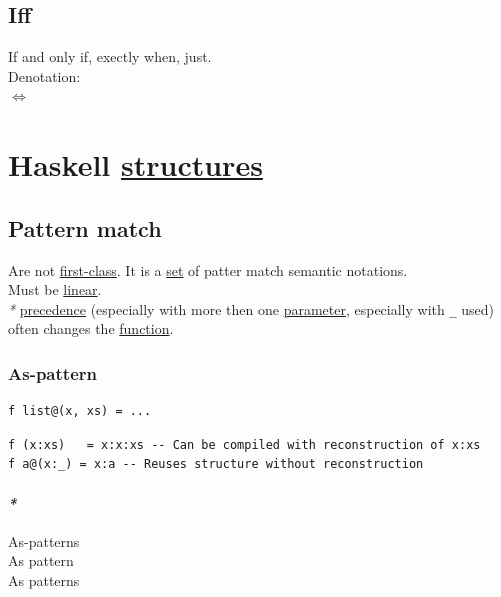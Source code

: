 \documentclass[a4paper,14pt,oneside]{book}
\begin{document}
\section{\label{orgb3a13f7}Iff}
\label{sec:org39ed823}
If and only if, exectly when, just.\\
Denotation:\\
\(\iff\)\\

\chapter{Haskell \hyperref[orgcf18e73]{structures}}
\label{sec:org6bf5f5c}
\section{\label{orga94283a}Pattern match}
\label{sec:org5e9137d}
Are not \hyperref[orgb8d89c3]{first-class}. It is a \hyperref[org0f7f8fa]{set} of patter match semantic notations.\\

Must be \hyperref[org9fc0700]{linear}.\\

\emph{*} \hyperref[orgc9c28a3]{precedence} (especially with more then one \hyperref[org63b5bc7]{parameter}, especially with \texttt{\_} used) often changes the \hyperref[orge00b05b]{function}.\\

\subsection{\label{org6647b2e}As-pattern}
\label{sec:org8aca01e}
\begin{verbatim}
f list@(x, xs) = ...
\end{verbatim}

\begin{verbatim}
f (x:xs)   = x:x:xs -- Can be compiled with reconstruction of x:xs
f a@(x:_) = x:a -- Reuses structure without reconstruction
\end{verbatim}

\subsubsection{\emph{*}}
\label{sec:org99d3ad0}

\label{org3114ce5}As-patterns\\
\label{org2a706fd}As pattern\\
\label{org344a273}As patterns\\
\end{document}

